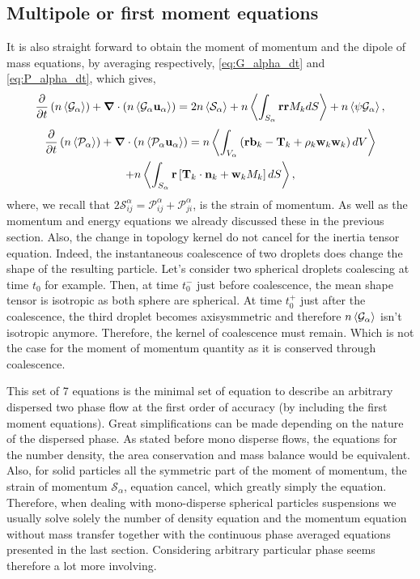 \subsection{Multipole or first moment equations}

It is also straight forward to obtain the moment of momentum and the dipole of mass equations, by averaging respectively, \ref{eq:G_alpha_dt} and \ref{eq:P_alpha_dt}, which gives, 
\begin{equation}
    \frac{\partial}{\partial t}   \left(n \left<\mathcal{G}_\alpha\right>\right)
    + \bm{\nabla} \cdot \left(n \left<\mathcal{G}_\alpha \textbf{u}_\alpha\right>\right) 
    = 2 n \left<\mathcal{S}_\alpha\right>
    + n \left<\int_{S_\alpha} \textbf{rr} M_k dS\right>
    +n \left<\psi \mathcal{G}_\alpha\right>,
    \label{eq:avg_p_G_alpha}
\end{equation}
\begin{multline}
    \frac{\partial}{\partial t}   \left(n \left<\mathcal{P}_\alpha\right>\right)
    + \bm{\nabla} \cdot \left(n \left<\mathcal{P}_\alpha \textbf{u}_\alpha\right>\right) 
    = n \left<\int_{V_\alpha} \left( 
        \textbf{r} \textbf{b}_k 
        - \textbf{T}_k
        + \rho_k \textbf{w}_k  \textbf{w}_k 
    \right) dV\right>\\
    + n \left<
    \int_{S_\alpha} \textbf{r} \left[
        \textbf{T}_k \cdot \textbf{n}_k
        + \textbf{w}_k M_k
    \right] dS\right>,
    \label{eq:avg_p_P_alpha}
\end{multline}
where, we recall that $2\mathcal{S}^\alpha_{ij} = \mathcal{P}^\alpha_{ij} + \mathcal{P}^\alpha_{ji}$, is the strain of momentum. 
As well as the momentum and energy equations we already discussed these in the previous section.
Also, the change in topology kernel do not cancel for the inertia tensor equation. Indeed, the instantaneous coalescence of two droplets does change the shape of the resulting particle.  
Let's consider two spherical droplets coalescing at time $t_0$ for example.
Then, at time $t_0^-$ just before coalescence, the mean shape tensor is isotropic as both sphere are spherical.
At time $t_0^+$ just after the coalescence, the third droplet becomes axisysmmetric and therefore $n \left<\mathcal{G}_\alpha\right>$ isn't isotropic anymore. 
Therefore, the kernel of coalescence must remain.  
Which is not the case for the moment of momentum quantity as it is conserved through coalescence. 

This set of 7 equations is the minimal set of equation to describe an arbitrary dispersed two phase flow at the first order of accuracy (by including the first moment equations).
Great simplifications can be made depending on the nature of the dispersed phase.
As stated before mono disperse flows, the equations for the number density, the area conservation and mass balance would be equivalent.
Also, for solid particles all the symmetric part of the moment of momentum, the strain of momentum $\mathcal{S}_\alpha$, equation cancel, which greatly simply the equation. 
Therefore, when dealing with mono-disperse spherical particles suspensions we usually solve solely the number of density equation and the momentum equation without mass transfer together with the continuous phase averaged equations presented in the last section. 
Considering arbitrary particular phase seems therefore a lot more involving. 

